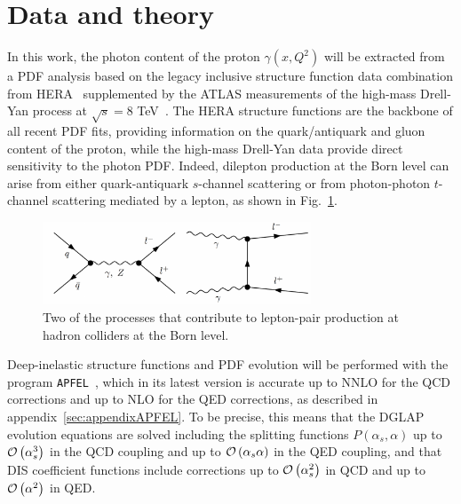 \section{Data and theory}
\label{sec:theory}

In this work, the photon
content of the proton $\gamma(x,Q^2)$ will be extracted from a PDF analysis based
on the legacy inclusive structure function data combination from HERA~\cite{Abramowicz:2015mha}
supplemented by the ATLAS measurements of the high-mass Drell-Yan process
at $\sqrt{s}=8$ TeV~\cite{Aad:2016zzw}.
%
The HERA structure functions are the backbone of all
recent PDF fits, providing information on the quark/antiquark and gluon content of 
the proton, while the high-mass Drell-Yan data provide
direct sensitivity to the photon PDF.
%
Indeed, dilepton production at the Born level can arise  from either quark-antiquark $s$-channel
scattering or from photon-photon $t$-channel scattering mediated by a lepton,
as shown in Fig.~\ref{fig:photoninduced}.

\begin{figure}[h]
  \begin{center}
    \includegraphics[width=8cm]{plots/photoninduced.pdf}
    \end{center}
  \caption{Two of the processes that contribute to lepton-pair
  production at hadron colliders at the Born level.}
\label{fig:photoninduced}
\end{figure}

Deep-inelastic structure functions and PDF evolution will be performed
with the program {\tt APFEL}~\cite{Bertone:2013vaa}, which in its latest
version is accurate up to NNLO for the QCD corrections and up to
NLO for the QED corrections, as described in appendix~\ref{sec:appendixAPFEL}.
%
To be precise, this means that the DGLAP evolution equations are solved including
the splitting functions $P(\alpha_s,\alpha)$ up to $\mathcal{O}\left( \alpha_s^3\right)$ in the QCD
coupling and up to $\mathcal{O}\left( \alpha_s\alpha\right)$ in the QED coupling,
and that DIS coefficient functions include corrections up to $\mathcal{O}\left( \alpha_s^2\right)$
in QCD and up to $\mathcal{O}\left( \alpha^2\right)$ in QED.

